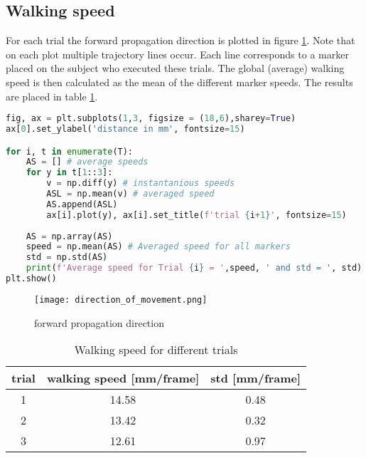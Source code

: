 \documentclass[english, a4paper, 11pt]{article}
\begin{document}
    \subsection{Walking speed}

        For each trial the forward propagation direction is plotted in figure \ref*{fig:trajectory}.
        Note that on each plot multiple trajectory lines occur. Each line corresponds to a marker placed
        on the subject who executed these trials. The global (average) walking speed is then calculated as the mean
        of the different marker speeds. The results are placed in table \ref*{tab:walking_speed}.

        \begin{lstlisting}[language=Python, caption=walking speed calculation and trajectory plotting]
fig, ax = plt.subplots(1,3, figsize = (18,6),sharey=True)
ax[0].set_ylabel('distance in mm', fontsize=15)

for i, t in enumerate(T):
    AS = [] # average speeds
    for y in t[1::3]:
        v = np.diff(y) # instantanious speeds
        ASL = np.mean(v) # averaged speed
        AS.append(ASL)
        ax[i].plot(y), ax[i].set_title(f'trial {i+1}', fontsize=15)
    
    AS = np.array(AS) 
    speed = np.mean(AS) # Averaged speed for all markers
    std = np.std(AS)
    print(f'Average speed for Trial {i} = ',speed, ' and std = ', std)
plt.show()
        \end{lstlisting}

        \begin{figure}[!h]
            \centering
            \texttt{[image: direction\_of\_movement.png]}
            \caption{forward propagation direction}
            \label{fig:trajectory}
        \end{figure}

        \begin{table}[!h]
            \centering
            \begin{tabular}{c|c|c}
                trial & walking speed [mm/frame] & std [mm/frame]\\ \hline
                1 & 14.58 & 0.48\\
                2 & 13.42 & 0.32\\
                3 & 12.61 & 0.97
            \end{tabular}
            \caption{Walking speed for different trials}
            \label{tab:walking_speed}
        \end{table}
\end{document}
